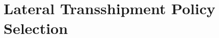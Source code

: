 \documentclass[../../main.tex]{subfiles}
\begin{document}

\section{Lateral Transshipment Policy Selection}




\end{document}
